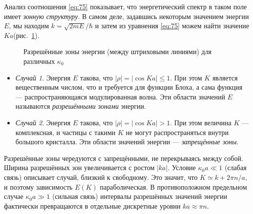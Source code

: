 \documentclass[a4paper]{article}
\begin{document}
\begin{sol}
Анализ соотношения \eqref{eq:75} показывает, что энергетический
спектр в таком поле имеет \emph{зонную структуру}. В самом деле,
задавшись некоторым значением энергии $E$, мы находим $k=
\sqrt{2mE} /\hbar$ и затем из уравнения \eqref{eq:75} можем
найти значение $Ka$(рис.~\ref{fig:6}).
\begin{figure}[]
	\centering
	\caption{Разрешённые зоны энергии (между штриховыми линиями) для различных $\kappa_0$}
	\label{fig:6}
\end{figure}
\begin{itemize}
	\item \emph{Случай 1}. Энергия $E$ такова, что
		$|\rho|=|\cos Ka|\le 1$. При этом $K$ является
		вещественным числом, что и требуется для функции
		Блоха, а сама функция --- распространяющаяся
		модулированная волна. Эти области значений
		$E$ называются \emph{разрешёнными зонами}
		энергии.
	\item \emph{Случай 2}. Энергия $E$ такова, что
	$|\rho|= |\cos Ka|
	>1$. При этом величина $K$ --- комплексная, и частицы
	с такими $K$ не могут распространяться внутри большого
	кристалла. Эти области значений энергии ---
	\emph{запрещённые зоны}.
\end{itemize}

Разрешённые зоны чередуются с запрещёнными, не перекрываясь между
собой. Ширина разрешённых зон увеличивается с ростом $|ka|$.
Условие $\kappa_0 a \ll 1$ (слабая связь) описывает случай,
близкий к свободному. Это значит, что $K \simeq k+ 2 \pi n /a$,
и поэтому зависимость $E(K)$ параболическая. В противоположном
предельном случае $\kappa_0 a\gg 1$ (сильная связь) интервалы
разрешённых значений энергии фактически превращаются в отдельные
дискретные уровни $ka \approx \pi n$.


\end{sol}
\end{document}
